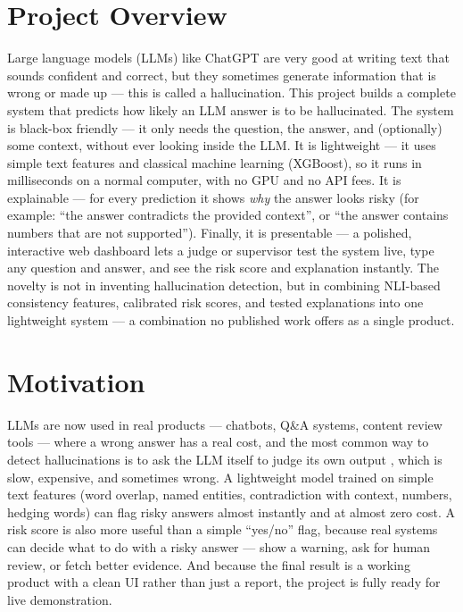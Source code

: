 \documentclass[12pt,a4paper]{article}
\begin{document}
\newpage

\section{Project Overview}

Large language models (LLMs) like ChatGPT are very good at writing text that sounds confident and correct, but they sometimes generate information that is wrong or made up --- this is called a hallucination. This project builds a complete system that predicts how likely an LLM answer is to be hallucinated. The system is black-box friendly --- it only needs the question, the answer, and (optionally) some context, without ever looking inside the LLM. It is lightweight --- it uses simple text features and classical machine learning (XGBoost), so it runs in milliseconds on a normal computer, with no GPU and no API fees. It is explainable --- for every prediction it shows \emph{why} the answer looks risky (for example: ``the answer contradicts the provided context'', or ``the answer contains numbers that are not supported''). Finally, it is presentable --- a polished, interactive web dashboard lets a judge or supervisor test the system live, type any question and answer, and see the risk score and explanation instantly. The novelty is not in inventing hallucination detection, but in combining NLI-based consistency features, calibrated risk scores, and tested explanations into one lightweight system --- a combination no published work offers as a single product.

\section{Motivation}

LLMs are now used in real products --- chatbots, Q\&A systems, content review tools --- where a wrong answer has a real cost, and the most common way to detect hallucinations is to ask the LLM itself to judge its own output \cite{selfcheck}, which is slow, expensive, and sometimes wrong. A lightweight model trained on simple text features (word overlap, named entities, contradiction with context, numbers, hedging words) can flag risky answers almost instantly and at almost zero cost. A risk score is also more useful than a simple ``yes/no'' flag, because real systems can decide what to do with a risky answer --- show a warning, ask for human review, or fetch better evidence. And because the final result is a working product with a clean UI rather than just a report, the project is fully ready for live demonstration.
\end{document}
